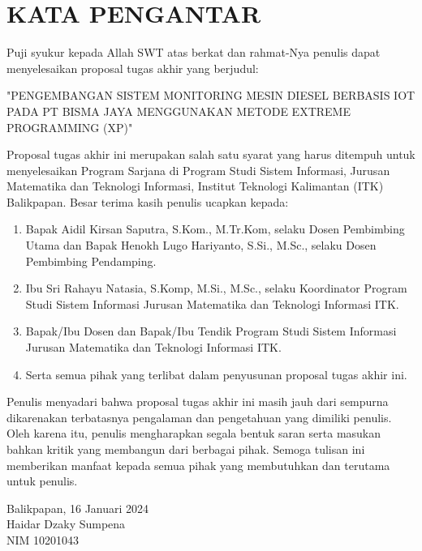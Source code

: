 \chapter*{KATA PENGANTAR}

Puji syukur kepada Allah SWT atas berkat dan rahmat-Nya penulis dapat menyelesaikan proposal tugas akhir yang berjudul:

\begin{center}
    "PENGEMBANGAN SISTEM MONITORING MESIN DIESEL BERBASIS IOT PADA PT BISMA JAYA MENGGUNAKAN METODE EXTREME PROGRAMMING (XP)"
\end{center}

Proposal tugas akhir ini merupakan salah satu syarat yang harus
ditempuh untuk menyelesaikan Program Sarjana di Program Studi Sistem
Informasi, Jurusan Matematika dan Teknologi Informasi, Institut Teknologi
Kalimantan (ITK) Balikpapan. Besar terima kasih penulis ucapkan kepada:

\begin{enumerate}[topsep=0pt,itemsep=0pt,partopsep=0pt, parsep=0pt]

    \item Bapak Aidil Kirsan Saputra, S.Kom., M.Tr.Kom, selaku Dosen Pembimbing Utama dan
    Bapak Henokh Lugo Hariyanto, S.Si., M.Sc., selaku Dosen Pembimbing
    Pendamping.

    \item Ibu Sri Rahayu Natasia, S.Komp, M.Si., M.Sc., selaku Koordinator Program
    Studi Sistem Informasi Jurusan Matematika dan Teknologi Informasi ITK.

    \item Bapak/Ibu Dosen dan Bapak/Ibu Tendik Program Studi Sistem Informasi
    Jurusan Matematika dan Teknologi Informasi ITK.

    \item Serta semua pihak yang terlibat dalam penyusunan proposal tugas akhir ini.
\end{enumerate}

Penulis menyadari bahwa proposal tugas akhir ini masih jauh dari sempurna dikarenakan terbatasnya pengalaman dan pengetahuan yang dimiliki penulis. Oleh karena itu, penulis mengharapkan segala bentuk saran serta masukan bahkan kritik yang membangun dari berbagai pihak. Semoga tulisan ini memberikan manfaat kepada semua pihak yang membutuhkan dan terutama untuk penulis.

\vspace{0.5cm}
\begin{flushright}
    Balikpapan, 16 Januari 2024\\
    \vspace{2cm}
    {Haidar Dzaky Sumpena}\\
    NIM {10201043}
\end{flushright}

